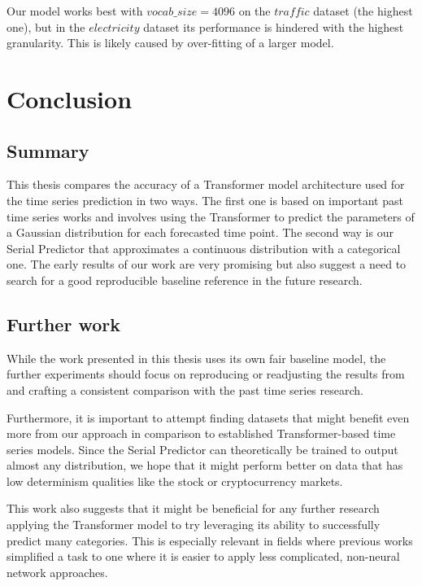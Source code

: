 \documentclass[en]{pracamgr}
\begin{document}
Our model works best with $vocab\_size = 4096$ on the $traffic$ dataset (the highest one), but in the $electricity$ dataset its performance is hindered with the highest granularity. This is likely caused by over-fitting of a larger model.




\chapter{Conclusion}

\section{Summary}

This thesis compares the accuracy of a Transformer model architecture used for the time series prediction in two ways. The first one is based on important past time series works and involves using the Transformer to predict the parameters of a Gaussian distribution for each forecasted time point. The second way is our Serial Predictor that approximates a continuous distribution with a categorical one. The early results of our work are very promising but also suggest a need to search for a good reproducible baseline reference in the future research.

\section{Further work}

While the work presented in this thesis uses its own fair baseline model, the further experiments should focus on reproducing or readjusting the results from \cite{enhancing} and crafting a consistent comparison with the past time series research.

Furthermore, it is important to attempt finding datasets that might benefit even more from our approach in comparison to established Transformer-based time series models. Since the Serial Predictor can theoretically be trained to output almost any distribution, we hope that it might perform better on data that has low determinism qualities like the stock or cryptocurrency markets.

This work also suggests that it might be beneficial for any further research applying the Transformer model to try leveraging its ability to successfully predict many categories.
This is especially relevant in fields where previous works simplified a task to one where it is easier to apply less complicated, non-neural network approaches.
\end{document}
